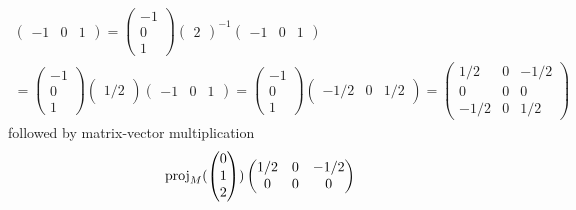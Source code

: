 \begin{exercises}
\begin{answer}
\begin{exparts}
\begin{multline*}
\begin{pmatrix}
               -1  &0  &1
             \end{pmatrix}
             =
             \begin{pmatrix}
               -1 \\ 0  \\  1
             \end{pmatrix}
               \begin{pmatrix}
                 2
               \end{pmatrix}^{-1}
             \begin{pmatrix}
               -1  &0  &1
             \end{pmatrix}              \\
             =
             \begin{pmatrix}
               -1 \\ 0  \\  1
             \end{pmatrix}
               \begin{pmatrix}
                 1/2
               \end{pmatrix}
             \begin{pmatrix}
               -1  &0  &1
             \end{pmatrix}
             =
             \begin{pmatrix}
               -1 \\ 0  \\  1
             \end{pmatrix}
             \begin{pmatrix}
               -1/2  &0  &1/2
             \end{pmatrix}
             =
             \begin{pmatrix}
               1/2  &0  &-1/2  \\
               0    &0  &0     \\
              -1/2  &0  &1/2
             \end{pmatrix}
           \end{multline*}
           followed by matrix-vector multiplication
           \begin{equation*}
             \proj{\colvec{0 \\ 1 \\ 2}}{M}
             \begin{pmatrix}
               1/2  &0  &-1/2  \\
               0    &0  &0     \\

\end{pmatrix}
\end{equation*}
\end{exparts}
\end{answer}
\end{exercises}
